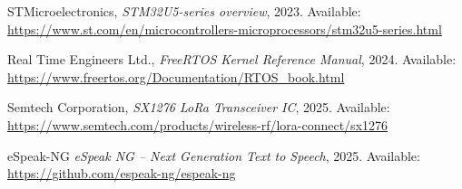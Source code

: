 \begin{thebibliography}{1}
STMicroelectronics,
\textit{STM32U5-series overview},
2023.
Available: \url{https://www.st.com/en/microcontrollers-microprocessors/stm32u5-series.html}

Real Time Engineers Ltd.,
\textit{FreeRTOS Kernel Reference Manual},
2024.
Available: \url{https://www.freertos.org/Documentation/RTOS_book.html}

Semtech Corporation,
\textit{SX1276 LoRa Transceiver IC},
2025.
Available: \url{https://www.semtech.com/products/wireless-rf/lora-connect/sx1276}

eSpeak-NG 
\textit{eSpeak NG -- Next Generation Text to Speech}, 
2025. 
Available: \url{https://github.com/espeak-ng/espeak-ng}
\end{thebibliography}
